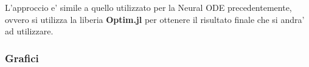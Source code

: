 L'approccio e' simile a quello utilizzato per la Neural ODE precedentemente, ovvero si 
utilizza la liberia \textbf{Optim.jl} \cite{vaibhav_kumar_dixit_2023_7738525} per 
ottenere il risultato finale che si andra' ad utilizzare.

\subsubsection{Grafici}